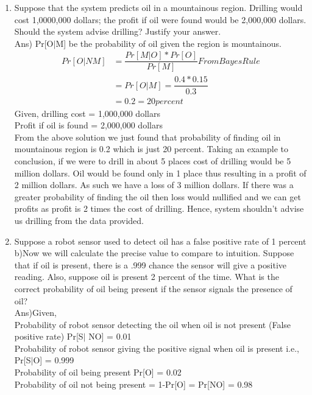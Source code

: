 \documentclass[11pt]{article}
\begin{document}
\begin{enumerate}
\item Suppose that the system predicts oil in a mountainous region. Drilling would cost 1,0000,000 dollars; the profit if oil were found would be 2,000,000 dollars. Should the system advise drilling? Justify your answer. \\
Ans) Pr[O$\mid$M] be the probability of oil given the region is mountainous.\\
\begin{align*}
Pr[O|NM] &= \dfrac{Pr[M|O]*Pr[O]}{Pr[M]} From Bayes Rule\\
&=Pr[O|M] = \dfrac{0.4 * 0.15}{0.3} \\
&= 0.2 = 20 percent
\end{align*}
Given, drilling cost = 1,000,000 dollars \\
Profit if oil is found = 2,000,000 dollars \\
From the above solution we just found that probability of finding oil in mountainous region is 0.2 which is just 20 percent. Taking an example to conclusion, if we were to drill in about 5 places cost of drilling would be 5 million dollars. Oil would be found only in 1 place thus resulting in a profit of 2 million dollars. As such we have a loss of 3 million dollars. If there was a greater probability of finding the oil then loss would nullified and we can get profits as profit is 2 times the cost of drilling. Hence, system shouldn't advise us drilling from the data provided. \\ 
\item Suppose a robot sensor used to detect oil has a false positive rate of 1 percent \\
b)Now we will calculate the precise value to compare to intuition.  Suppose that if oil is present, there is a .999 chance the sensor will give a positive reading.  Also, suppose oil is present 2 percent of the time.   What is the correct probability of oil being present if the sensor signals the presence of oil? \\
Ans)Given, \\
Probability of robot sensor detecting the oil when oil is not present (False positive rate) Pr[S$\mid$ NO] = 0.01 \\
Probability of robot sensor giving the positive signal when oil is present i.e., Pr[S$\mid$O] = 0.999 \\
Probability of oil being present Pr[O] = 0.02 \\
Probability of oil not being present = 1-Pr[O] = Pr[NO] = 0.98 \\

\end{enumerate}
\end{document}
